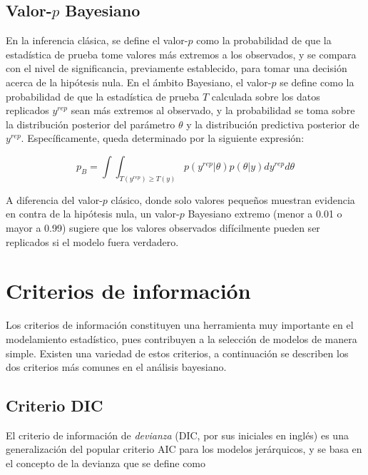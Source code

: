 \documentclass[
  10pt,
  spanish,
]{book}
\theoremstyle{definition}
\theoremstyle{definition}
\theoremstyle{definition}
\theoremstyle{definition}
\theoremstyle{remark}
\begin{document}
\hypertarget{valor-p-bayesiano}{%
\subsection{\texorpdfstring{Valor-\(p\) Bayesiano}{Valor-p Bayesiano}}\label{valor-p-bayesiano}}

En la inferencia clásica, se define el valor-\(p\) como la probabilidad de
que la estadística de prueba tome valores más extremos a los observados,
y se compara con el nivel de significancia, previamente establecido,
para tomar una decisión acerca de la hipótesis nula. En el ámbito
Bayesiano, el valor-\(p\) se define como la probabilidad de que la
estadística de prueba \(T\) calculada sobre los datos replicados \(y^{rep}\)
sean más extremos al observado, y la probabilidad se toma sobre la
distribución posterior del parámetro \(\theta\) y la distribución
predictiva posterior de \(y^{rep}\). Específicamente, queda determinado
por la siguiente expresión:

\begin{equation*}
p_B=\int\int_{T(y^{rep}) \geq T(y)}p(y^{rep}|\theta)p(\theta|y)dy^{rep}d\theta
\end{equation*}

A diferencia del valor-\(p\) clásico, donde solo valores pequeños muestran
evidencia en contra de la hipótesis nula, un valor-\(p\) Bayesiano extremo
(menor a 0.01 o mayor a 0.99) sugiere que los valores observados
difícilmente pueden ser replicados si el modelo fuera verdadero.

\hypertarget{criterios-de-informaciuxf3n}{%
\section{Criterios de información}\label{criterios-de-informaciuxf3n}}

Los criterios de información constituyen una herramienta muy importante
en el modelamiento estadístico, pues contribuyen a la selección de
modelos de manera simple. Existen una variedad de estos criterios, a
continuación se describen los dos criterios más comunes en el análisis
bayesiano.

\hypertarget{criterio-dic}{%
\subsection{Criterio DIC}\label{criterio-dic}}

El criterio de información de \emph{devianza} (DIC, por sus iniciales en inglés) es una generalización del popular criterio AIC para
los modelos jerárquicos, y se basa en el concepto de la devianza que se
define como
\end{document}

